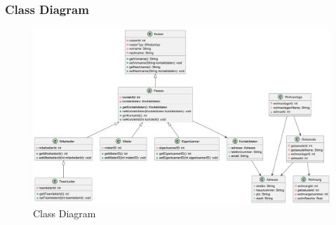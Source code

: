\begin{frame}
\frametitle{Class Diagram}

\begin{figure}
  \includegraphics[height=0.9\textheight]{figures/model_Gesamt.png}
  \caption{Class Diagram}
  \label{fig:class}
\end{figure}

\end{frame}




